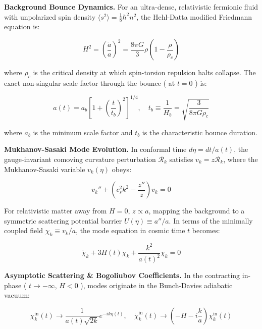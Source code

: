 \documentclass[11pt,a4paper]{article}
\theoremstyle{definition}
\theoremstyle{remark}
\begin{document}
\textbf{Background Bounce Dynamics.} For an ultra-dense, relativistic fermionic fluid with unpolarized spin density $\langle s^2 \rangle = \frac{1}{8}\hbar^2 n^2$, the Hehl-Datta modified Friedmann equation is:


\begin{equation}
H^2 = \left(\frac{\dot{a}}{a}\right)^2 = \frac{8\pi G}{3}\rho \left(1 - \frac{\rho}{\rho_c}\right)
\end{equation}


where $\rho_c$ is the critical density at which spin-torsion repulsion halts collapse. The exact non-singular scale factor through the bounce ( at $t = 0$ ) is:


\begin{equation}
a(t) = a_b \left[ 1 + \left(\frac{t}{t_b}\right)^2 \right]^{1/4}, \quad t_b \equiv \frac{1}{H_b} = \sqrt{\frac{3}{8\pi G \rho_c}}
\end{equation}


where $a_b$ is the minimum scale factor and $t_b$ is the characteristic bounce duration.

\textbf{Mukhanov-Sasaki Mode Evolution.} In conformal time $d\eta = dt / a(t)$, the gauge-invariant comoving curvature perturbation $\mathcal{R}_k$ satisfies $v_k = z \mathcal{R}_k$, where the Mukhanov-Sasaki variable $v_k(\eta)$ obeys:


\begin{equation}
v_k'' + \left( c_s^2 k^2 - \frac{z''}{z} \right) v_k = 0
\end{equation}


For relativistic matter away from $H=0$, $z \propto a$, mapping the background to a symmetric scattering potential barrier $U(\eta) \equiv a''/a$. In terms of the minimally coupled field $\chi_k \equiv v_k / a$, the mode equation in cosmic time $t$ becomes:


\begin{equation}
\ddot{\chi}_k + 3H(t) \dot{\chi}_k + \frac{k^2}{a(t)^2} \chi_k = 0
\end{equation}


\textbf{Asymptotic Scattering \& Bogoliubov Coefficients.} In the contracting in-phase ( $t \to -\infty$, $H < 0$ ), modes originate in the Bunch-Davies adiabatic vacuum:


\begin{equation}
\chi_k^{\text{in}}(t) \to \frac{1}{a(t)\sqrt{2k}} e^{-i k \eta(t)}, \quad \dot{\chi}_k^{\text{in}}(t) \to \left( -H - i \frac{k}{a} \right) \chi_k^{\text{in}}(t)
\end{equation}
\end{document}
